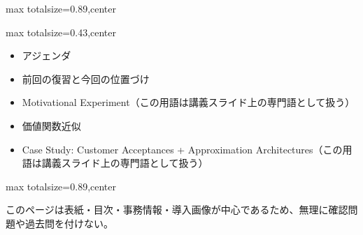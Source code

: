 \begin{minipage}[t]{0.58\textwidth}
\begin{adjustbox}{max totalsize={\textwidth}{0.89\textheight},center}
\begin{minipage}{\textwidth}
\end{minipage}
\end{adjustbox}
\end{minipage}


\clearpage
{}
\begin{minipage}[t]{0.405\textwidth}
\begin{adjustbox}{max totalsize={\textwidth}{0.43\textheight},center}
\begin{minipage}{\textwidth}\scriptsize
{}\begin{itemize}
\item アジェンダ
\item 前回の復習と今回の位置づけ
\item Motivational Experiment（この用語は講義スライド上の専門語として扱う）
\item 価値関数近似
\item Case Study: Customer Acceptances + Approximation Architectures（この用語は講義スライド上の専門語として扱う）
\end{itemize}
\end{minipage}
\end{adjustbox}
\end{minipage}\hfill
\begin{minipage}[t]{0.58\textwidth}
\begin{adjustbox}{max totalsize={\textwidth}{0.89\textheight},center}
\begin{minipage}{\textwidth}\scriptsize
{}このページは表紙・目次・事務情報・導入画像が中心であるため、無理に確認問題や過去問を付けない。
\end{minipage}
\end{adjustbox}
\end{minipage}


